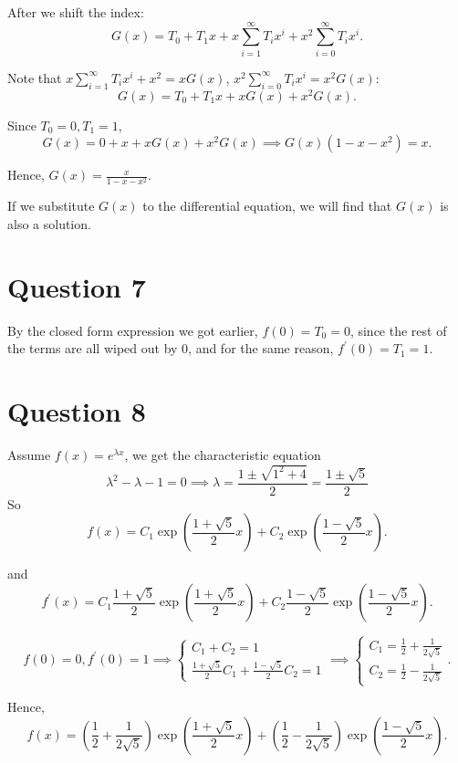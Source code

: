 \documentclass[12pt,a4paper]{article}
\begin{document}
\begin{solution}
\begin{remark}
After we shift the index:
\[
G(x)=T_0+T_1 x+x \sum_{i=1}^{\infty} T_i x^i+x^2 \sum_{i=0}^{\infty} T_i x^i.
\]

Note that $x\sum_{i=1}^{\infty} T_i x^i+x^2 = xG(x)$, $x^2 \sum_{i=0}^{\infty} T_i x^i = x^2G(x)$:
\[
G(x)=T_0+T_1 x+x G(x)+x^2 G(x).
\]

Since $T_0 = 0, T_1 = 1$,
\[
G(x)=0+x+x G(x)+x^2 G(x) \implies G(x)\left(1-x-x^2\right)=x.
\]

Hence, $G(x) = \frac{x}{1-x-x^2}$.

If we substitute $G(x)$ to the differential equation, we will find that $G(x)$ is also a solution.
\end{remark}
\end{solution}

\section*{Question 7}
\begin{solution}
By the closed form expression we got earlier, $f(0) = T_0= 0$, since the rest of the terms are all wiped out by 0, and for the same reason, $f^{\prime}(0) = T_1= 1$. 
\end{solution}

\section*{Question 8}
\begin{solution}
Assume $f(x) = e^{\lambda x}$,
we get the characteristic equation
\[
\lambda^2 - \lambda - 1 = 0 \implies \lambda=\frac{1 \pm \sqrt{1^2+4}}{2}=\frac{1 \pm \sqrt{5}}{2}
\]
So
\[
f(x) = C_1\exp \left(\frac{1+\sqrt{5}}{2}x\right) + C_2\exp \left(\frac{1-\sqrt{5}}{2}x\right).
\]

and
\[
f^\prime(x) = C_1\frac{1+\sqrt{5}}{2}\exp \left(\frac{1+\sqrt{5}}{2}x\right) + C_2\frac{1-\sqrt{5}}{2}\exp \left(\frac{1-\sqrt{5}}{2}x\right).
\]

\[
f(0)=0, f^\prime(0) = 1 \implies
\begin{cases}
C_1+C_2 = 1\\
\frac{1+\sqrt{5}}{2}C_1 + \frac{1-\sqrt{5}}{2}C_2 = 1
\end{cases}
\implies
\begin{cases}
C_1 = \frac{1}{2}+\frac{1}{2\sqrt{5}}\\
C_2 = \frac{1}{2}-\frac{1}{2\sqrt{5}}
\end{cases}.
\]

Hence,
\[
f(x) = \left(\frac{1}{2}+\frac{1}{2\sqrt{5}}\right)\exp \left(\frac{1+\sqrt{5}}{2}x\right)
+ \left(\frac{1}{2}-\frac{1}{2\sqrt{5}}\right)\exp \left(\frac{1-\sqrt{5}}{2}x\right).
\]
\end{solution}
\end{document}
